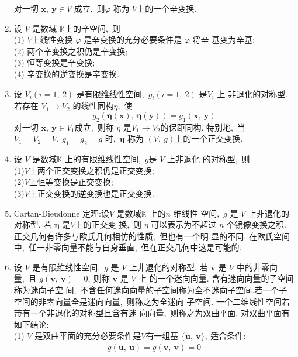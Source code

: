 \begin{enumerate}
		对一切  $\boldsymbol{x},\  \boldsymbol{y} \in V $ 成立,\  则$  \varphi $ 称为  $V $上的一个辛变换.
		\item 设 $ V $ 是数域  $\mathbb{K}  $上的辛空问,\  则\\
		(1) $ V  $上线性变换 $ \varphi$  是辛变换的充分必要条件是  $\varphi $ 将辛 基变为辛基;\\
		(2) 两个辛变换之积仍是辛变换;\\
		(3) 恒等变换是辛变换;\\
		(4) 辛变换的逆变换是辛变换.
		\item 设  $V_{i}(i=1,\ 2)$  是有限维线性空间,\   $g_{i}(i=1,\ 2) $ 是$  V_{i} $ 上 非退化的对称型. 若存在  $V_{1} \rightarrow V_{2} $ 的线性同构$  \eta $,\  使
		$$g_{2}(\boldsymbol{\eta}(\boldsymbol{x}),\  \boldsymbol{\eta}(\boldsymbol{y}))=g_{1}(\boldsymbol{x},\  \boldsymbol{y})$$
		对一切 $ \boldsymbol{x},\  \boldsymbol{y} \in V_{1}  $成立,\  则称 $\eta $ 是$  V_{1} \rightarrow V_{2}  $的保距同构. 特别地,\  当 $ V_{1}=V_{2}=V,\  g_{1}=g_{2}=g $ 时,\  $ \boldsymbol{\eta} $ 称为 $ (V,\  g)  $上的一个正交变换.
		\item 设  $V $ 是数域$  \mathbb{K} $ 上的有限维线性空间,\  $ g  $是 $ V$  上非退化 的对称型,\  则\\
		(1)$V$上两个正交变换之积仍是正交变换;\\
		(2)$V$上恒等变换是正交变换;\\
		(3)$V$上正交变换的逆变换也是正交变换.
		\item Cartan-Dieudonne 定理:设$  V$  是数域$  \mathbb{K} $ 上的$  n $ 维线性 空间,\   $g$  是  $V$  上非退化的对称型. 若  $\boldsymbol{\eta}$ 是$  V  $上的正交变 换,\  则  $\eta $ 可以表示为不超过  $n$  个镜像变换之积.
		正交几何有许多与欧氏几何相仿的性质,\  但也有一个明 显的不同. 在欧氏空间中,\  任一非零向量不能与自身垂直,\  但在正交几何中这是可能的.
		\item 设  $V $ 是有限维线性空间,\  $ g$  是 $ V$  上非退化的对称型. 若  $\boldsymbol{v} $ 是  $V $ 中的非零向量,\  且 $ g(\boldsymbol{v},\  \boldsymbol{v})=0 ,\  $则称  $\boldsymbol{v} $ 是 $ V $ 上 的一个迷向向量. 含有迷向向量的子空间称为迷向子空 间,\  不含任何迷向向量的子空间称为全不迷向子空间.若一个子空间的非零向量全是迷向向量,\  则称之为全迷向 子空间.
		一个二维线性空间若带有一个非退化的对称型且含有迷 向向量,\  则称之为双曲平面. 对双曲平面有如下结论:\\
		(1)  $V $ 是双曲平面的充分必要条件是$  V  $有一组基 $ \{\boldsymbol{u},\  \boldsymbol{v}\} ,\  $适合条件:
		$$\begin{array}{l}
			g(\boldsymbol{u},\  \boldsymbol{u})=g(\boldsymbol{v},\  \boldsymbol{v})=0 \\

\end{array}$$
\end{enumerate}
